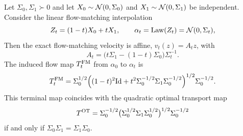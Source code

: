 \begin{prop}\label{prop-gaussian-flow-matching-optimality}
	Let $\Sigma_0,\Sigma_1\succ0$ and let $X_0\sim\mathcal{N}(0,\Sigma_0)$ and $X_1\sim\mathcal{N}(0,\Sigma_1)$ be independent. Consider the linear flow-matching interpolation
	\[
		Z_t=(1-t)X_0+tX_1,
		\qquad
		\alpha_t=\operatorname{Law}(Z_t)=\mathcal{N}(0,\Sigma_t),
	\]
	Then the exact flow-matching velocity is affine, $v_t(z)=A_tz$, with
	\begin{equation}\label{eq-gaussian-product-fm-velocity}
		A_t=\bigl(t\Sigma_1-(1-t)\Sigma_0\bigr)\Sigma_t^{-1}.
	\end{equation}
	The induced flow map $T_t^{\rm FM}$ from $\alpha_0$ to $\alpha_t$ is
	\begin{equation}\label{eq-gaussian-product-fm-map}
		T_t^{\rm FM}
		=
		\Sigma_0^{1/2}
		\Bigl((1-t)^2\mathrm{Id}+t^2\Sigma_0^{-1/2}\Sigma_1\Sigma_0^{-1/2}\Bigr)^{1/2}
		\Sigma_0^{-1/2}.
	\end{equation}
	This terminal map coincides with the quadratic optimal transport map
	\begin{equation}\label{eq-gaussian-brenier-map-comparison}
		T^{\rm OT}
		=
		\Sigma_0^{-1/2}
		\bigl(\Sigma_0^{1/2}\Sigma_1\Sigma_0^{1/2}\bigr)^{1/2}
		\Sigma_0^{-1/2}
	\end{equation}
	if and only if $\Sigma_0\Sigma_1=\Sigma_1\Sigma_0$.
\end{prop}

